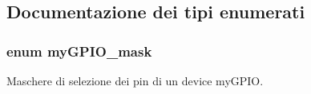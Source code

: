 \subsection{Documentazione dei tipi enumerati}
\hypertarget{group__my_g_p_i_o_ga402a0d20afc0cb7c25554b8b023f4253}{
\subsubsection[{my\+G\+P\+I\+O\+\_\+mask}]{\setlength{\rightskip}{0pt plus 5cm}enum {\bf my\+G\+P\+I\+O\+\_\+mask}}}\label{group__my_g_p_i_o_ga402a0d20afc0cb7c25554b8b023f4253}


Maschere di selezione dei pin di un device my\+G\+P\+I\+O. 

